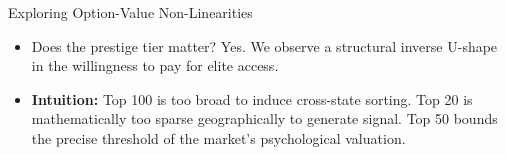 \documentclass[10pt, aspectratio=169]{beamer}
\begin{document}
\begin{frame}[shrink=30]{Exploring Option-Value Non-Linearities}
    \begin{itemize}
        \item Does the prestige tier matter? Yes. We observe a structural inverse U-shape in the willingness to pay for elite access.
    \end{itemize}
    \vspace{0.3cm}
    \begin{table}
        \centering
        \caption{Option Value Non-Linearities: Caliber Tier Comparison (Two-Way Clustered SE)}
    \end{table}
    \begin{itemize}
        \item \textbf{Intuition:} Top 100 is too broad to induce cross-state sorting. Top 20 is mathematically too sparse geographically to generate signal. Top 50 bounds the precise threshold of the market's psychological valuation.
    \end{itemize}
\end{frame}
\end{document}

